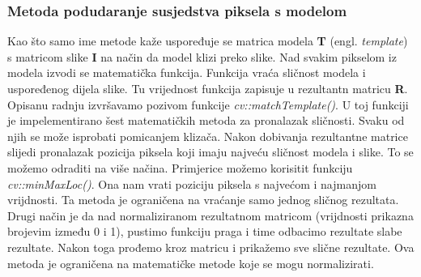 \subsubsection{Metoda podudaranje susjedstva piksela s modelom}
Kao što samo ime metode kaže uspoređuje se matrica modela \textbf{T}
(engl. \textit{template}) s matricom slike \textbf{I} na način da
model klizi preko slike. Nad svakim pikselom iz modela izvodi se
matematička funkcija. Funkcija vraća sličnost modela i uspoređenog
dijela slike. Tu vrijednost funkcija zapisuje u rezultantn matricu
\textbf{R}. Opisanu radnju izvršavamo pozivom funkcije
\textit{cv::matchTemplate()}. U toj funkciji je impelementirano šest
matematičkih metoda za pronalazak sličnosti. Svaku od njih se može
isprobati pomicanjem klizača. Nakon dobivanja rezultantne matrice
slijedi pronalazak pozicija piksela koji imaju najveću sličnost modela i
slike. To se možemo odraditi na više načina. Primjerice možemo korisitit 
funkciju \textit{cv::minMaxLoc()}. Ona nam vrati poziciju piksela s najvećom i
najmanjom vrijdnosti. Ta metoda je ograničena na vraćanje samo jednog 
sličnog rezultata. Drugi način je da nad normaliziranom rezultatnom
matricom (vrijdnosti prikazna brojevim između 0 i 1), pustimo funkciju
praga i time odbacimo rezultate slabe rezultate. Nakon toga prođemo kroz
matricu i prikažemo sve slične rezultate. Ova metoda je ograničena na
matematičke metode koje se mogu normalizirati.
\\

